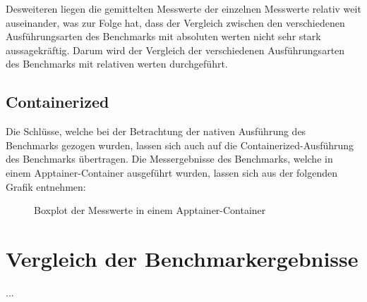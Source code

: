 Desweiteren liegen die gemittelten Messwerte der einzelnen Messwerte relativ weit auseinander, was zur Folge hat, dass der Vergleich zwischen den verschiedenen Ausführungsarten des Benchmarks mit absoluten werten nicht sehr stark aussagekräftig. Darum wird der Vergleich der verschiedenen Ausführungsarten des Benchmarks mit relativen werten durchgeführt.

\subsection{Containerized}

Die Schlüsse, welche bei der Betrachtung der nativen Ausführung des Benchmarks gezogen wurden, lassen sich auch auf die Containerized-Ausführung des Benchmarks übertragen. Die Messergebnisse des Benchmarks, welche in einem Apptainer-Container ausgeführt wurden, lassen sich aus der folgenden Grafik entnehmen:

\begin{figure}[!h]
    \centering
    
    \caption{Boxplot der Messwerte in einem Apptainer-Container}
    \label{fig:boxplot_apptainer}
\end{figure}
\FloatBarrier

\section{Vergleich der Benchmarkergebnisse}

...


